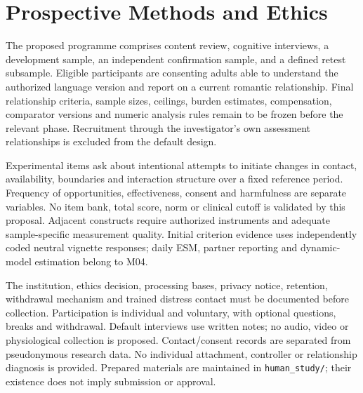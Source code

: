 \section{Prospective Methods and Ethics}

The proposed programme comprises content review, cognitive interviews, a development sample, an independent confirmation sample, and a defined retest subsample. Eligible participants are consenting adults able to understand the authorized language version and report on a current romantic relationship. Final relationship criteria, sample sizes, ceilings, burden estimates, compensation, comparator versions and numeric analysis rules remain to be frozen before the relevant phase. Recruitment through the investigator's own assessment relationships is excluded from the default design.

Experimental items ask about intentional attempts to initiate changes in contact, availability, boundaries and interaction structure over a fixed reference period. Frequency of opportunities, effectiveness, consent and harmfulness are separate variables. No item bank, total score, norm or clinical cutoff is validated by this proposal. Adjacent constructs require authorized instruments and adequate sample-specific measurement quality. Initial criterion evidence uses independently coded neutral vignette responses; daily ESM, partner reporting and dynamic-model estimation belong to M04.

The institution, ethics decision, processing bases, privacy notice, retention, withdrawal mechanism and trained distress contact must be documented before collection. Participation is individual and voluntary, with optional questions, breaks and withdrawal. Default interviews use written notes; no audio, video or physiological collection is proposed. Contact/consent records are separated from pseudonymous research data. No individual attachment, controller or relationship diagnosis is provided. Prepared materials are maintained in \texttt{human\_study/}; their existence does not imply submission or approval.
